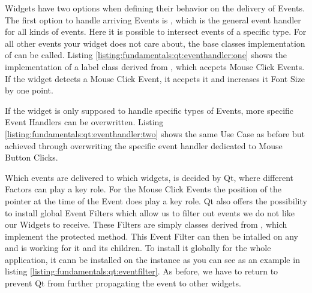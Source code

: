 Widgets have two options when defining their behavior on the delivery of Events. The first option to handle arriving Events is , which is the general event handler for all kinds of events. Here it is possible to intersect events of a specific type. For all other events your widget does not care about, the base classes implementation of  can be called. Listing \ref{listing:fundamentals:qt:eventhandler:one} shows the implementation of a label class derived from , which accpets Mouse Click Events. If the widget detects a Mouse Click Event, it accpets it and increases it Font Size by one point.



If the widget is only supposed to handle specific types of Events, more specific Event Handlers can be overwritten. Listing \ref{listing:fundamentals:qt:eventhandler:two} shows the same Use Case as before but achieved through overwriting the specific event handler dedicated to Mouse Button Clicks.



Which events are delivered to which widgets, is decided by Qt, where different Factors can play a key role. For the Mouse Click Events the position of the pointer at the time of the Event does play a key role. Qt also offers the possibility to install global Event Filters which allow us to filter out events we do not like our Widgets to receive. These Filters are simply classes derived from , which implement the  protected method. This Event Filter can then be intalled on any  and is working for it and its children. To install it globally for the whole application, it cann be installed on the  instance as you can see as an example in listing \ref{listing:fundamentals:qt:eventfilter}. As before, we have to return  to prevent Qt from further propagating the event to other widgets.

